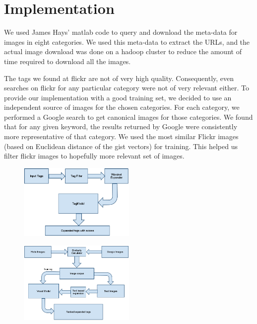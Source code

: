 \documentclass[12pt]{article}
\begin{document}
\section{Implementation}
We used James Hays' matlab code to query and download the meta-data for images
in eight categories. We used this meta-data to extract the URLs, and the actual
image download was done on a hadoop cluster to reduce the amount of time
required to download all the images.

The tags we found at flickr are not of very high quality. Consequently, even
searches on flickr for any particular category were not of very relevant either.
To provide our implementation with a good training set, we decided to use an
independent source of images for the chosen categories.
For each category, we performed a Google search to get canonical images for
those categories. We found that for any given keyword, the results returned
by Google were consistently more representative of that category. We used the
most similar Flickr images (based on Euclidean distance of the gist vectors)
for training. This helped us filter flickr images to hopefully more relevant
set of images.


\begin{figure}[h]
\includegraphics[width=0.5\textwidth]{tagExpansion.png}
\end{figure}

\begin{figure}[h]
\includegraphics[width=0.5\textwidth]{model.png}
\end{figure}
\end{document}
